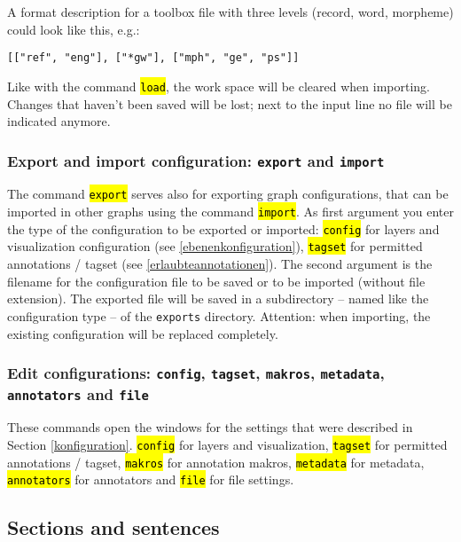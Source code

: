 \documentclass[12pt]{scrartcl}
\newcommand{\code}[1]{\hl{\texttt{#1}}}
\begin{document}
A format description for a toolbox file with three levels (record, word, morpheme) could look like this, e.g.:

\begin{lstlisting}[gobble=4]
	[["ref", "eng"], ["*gw"], ["mph", "ge", "ps"]]
\end{lstlisting}

Like with the command \code{load}, the work space will be cleared when importing.
Changes that haven’t been saved will be lost; next to the input line no file will be indicated anymore.


\subsubsection{Export and import configuration: \texttt{export} and \texttt{import}}

The command \code{export} serves also for exporting graph configurations, that can be imported in other graphs using the command \code{import}.
As first argument you enter the type of the configuration to be exported or imported: \code{config} for layers and visualization configuration (see \ref{ebenenkonfiguration}), \code{tagset} for permitted annotations / tagset (see \ref{erlaubteannotationen}).
The second argument is the filename for the configuration file to be saved or to be imported (without file extension).
The exported file will be saved in a subdirectory – named like the configuration type – of the \texttt{exports} directory.
Attention: when importing, the existing configuration will be replaced completely.


\subsubsection{Edit configurations: \texttt{config}, \texttt{tagset}, \texttt{makros}, \texttt{metadata}, \texttt{annotators} and \texttt{file}}

These commands open the windows for the settings that were described in Section \ref{konfiguration}.
\code{config} for layers and visualization, \code{tagset} for permitted annotations / tagset, \code{makros} for annotation makros, \code{metadata} for metadata, \code{annotators} for annotators and \code{file} for file settings.


\subsection{Sections and sentences}
\end{document}
